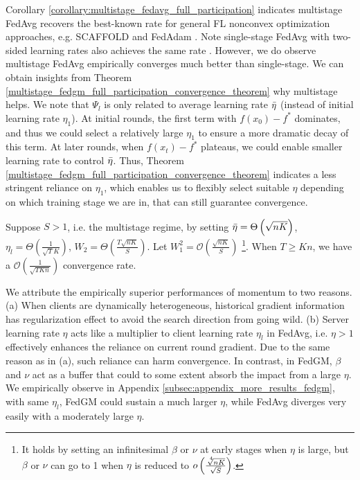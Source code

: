 \begin{remark}
Corollary \ref{corollary:multistage_fedavg_full_participation} indicates multistage FedAvg recovers the best-known rate for general FL nonconvex optimization approaches, e.g. SCAFFOLD \citep{karimireddy2020scaffold} and FedAdam \citep{reddi2020adaptive}. Note single-stage FedAvg with two-sided learning rates also achieves the same rate \citep{yang2021achieving}. However, we do observe multistage FedAvg empirically converges much better than single-stage. We can obtain insights from Theorem \ref{multistage_fedgm_full_participation_convergence_theorem} why multistage helps. We note that $\Psi_l$ is only related to average learning rate $\Bar{\eta}$ (instead of initial learning rate $\eta_1$). At initial rounds, the first term with $f(x_0)-f^\ast$ dominates, and thus we could select a relatively large $\eta_1$ to ensure a more dramatic decay of this term. At later rounds, when $f(x_t)-f^\ast$ plateaus, we could enable smaller learning rate to control $\Bar{\eta}$. Thus, Theorem \ref{multistage_fedgm_full_participation_convergence_theorem} indicates a less stringent reliance on $\eta_1$, which enables us to flexibly select suitable $\eta$ depending on which training stage we are in, that can still guarantee convergence.
\label{remark:full_participation_why_multistage_helps}
\end{remark}

\begin{corollary}
Suppose $S>1$, i.e. the multistage regime, by setting $\Bar{\eta} = \Theta\left(\sqrt{nK}\right)$, $\eta_l=\Theta\left(\frac{1}{\sqrt{T}K}\right)$, $W_2=\Theta\left(\frac{T\sqrt{nK}}{S}\right)$. Let $W_1^2=\mathcal{O}\left(\frac{\sqrt{nK}}{S}\right)$ \footnote{It holds by setting an infinitesimal $\beta$ or $\nu$ at early stages when $\eta$ is large, but $\beta$ or $\nu$ can go to 1 when $\eta$ is reduced to $o\left( \frac{\sqrt[\leftroot{-3}\uproot{3}4]{nK}}{\sqrt{S}} \right)$.}. When $T\ge Kn$, we have a $\mathcal{O}\left(\frac{1}{\sqrt{TKn}}\right)$ convergence rate. 
\label{corollary:multistage_fedgm_full_participation}
\end{corollary}


\begin{remark}
We attribute the empirically superior performances of momentum to two reasons. (a) When clients are dynamically heterogeneous, historical gradient information has regularization effect to avoid the search direction from going wild. (b) Server learning rate $\eta$ acts like a multiplier to client learning rate $\eta_l$ in FedAvg, i.e. $\eta>1$ effectively enhances the reliance on current round gradient. Due to the same reason as in (a), such reliance can harm convergence. In contrast, in FedGM, $\beta$ and $\nu$ act as a buffer that could to some extent absorb the impact from a large $\eta$. We empirically observe in Appendix \ref{subsec:appendix_more_results_fedgm}, with same $\eta_l$, FedGM could sustain a much larger $\eta$, while FedAvg diverges very easily with a moderately large $\eta$.
\label{remark:full_participation_why_momentum_helps}
\end{remark}




